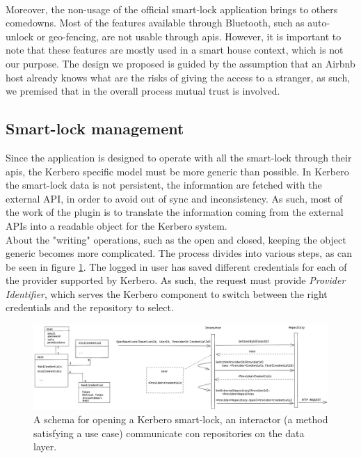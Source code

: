\\ Moreover, the non-usage of the official smart-lock application brings to others comedowns. Most of the features available through Bluetooth, such as auto-unlock or geo-fencing, are not usable through \acrshort{api}s. However, it is important to note that these features are mostly used in a smart house context, which is not our purpose. The design we proposed is guided by the assumption that an Airbnb host already knows what are the risks of giving the access to a stranger, as such, we premised that in the overall process mutual trust is involved.

\subsection{Smart-lock management}
Since the application is designed to operate with all the smart-lock through their \acrshort{api}s, the Kerbero specific model must be more generic than possible. In Kerbero the smart-lock data is not persistent, the information are fetched with the external API, in order to avoid out of sync and inconsistency. As such, most of the work of the plugin is to translate the information coming from the external APIs into a readable object for the Kerbero system.
\\ About the "writing" operations, such as the open and closed, keeping the object generic becomes more complicated. The process divides into various steps, as can be seen in figure \ref{fig:opensmartlock}. The logged in user has saved different credentials for each of the provider supported by Kerbero. As such, the request must provide \textit{Provider Identifier}, which serves the Kerbero component to switch between the right credentials and the repository to select. 
\begin{figure}[ht]
    \centering
    \includegraphics[width=\textwidth]{figures/open.excalidraw.png}
    \caption{A schema for opening a Kerbero smart-lock, an interactor (a method satisfying a use case) communicate con repositories on the data layer.}
    \label{fig:opensmartlock}
\end{figure}

